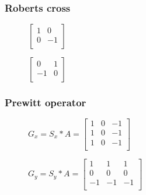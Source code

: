 \subsubsection{Roberts cross}

\begin{figure}[!htb]
    \centering
    \begin{minipage}{.5\textwidth}
        \centering
        $\left[ \begin{array}{rr}
        1 & 0 \\
        0 & -1 \\
        \end{array}\right] $
    \end{minipage}%
    \begin{minipage}{.5\textwidth}
        \centering
        $\left[ \begin{array}{rr}
        0 & 1 \\
        -1 & 0 \\
        \end{array}\right] $
    \end{minipage}
\end{figure}

\subsubsection{Prewitt operator}

\begin{figure}[!htb]
    \centering
    \begin{minipage}{.5\textwidth}
        \centering
        $G_{x} = S_{x} * A =
        \left[ \begin{array}{rrr}
        1 & 0 & -1 \\
        1 & 0 & -1 \\
        1 & 0 & -1 \\
        \end{array}\right] $
    \end{minipage}%
    \begin{minipage}{.5\textwidth}
        \centering
        $G_{y} = S_{y} * A =
        \left[ \begin{array}{rrr}
        1 & 1 & 1 \\
        0 & 0 & 0 \\
        -1 & -1 & -1 \\
        \end{array}\right] $
    \end{minipage}
\end{figure}

